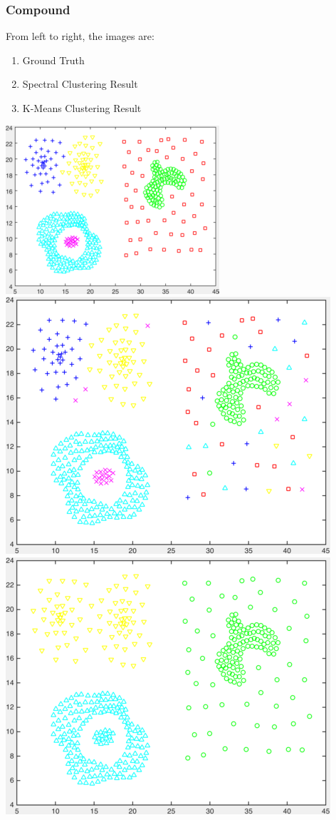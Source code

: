 \documentclass[11pt]{article}
\begin{document}
\subsubsection*{Compound} 
From left to right, the images are:
\begin{enumerate}
\item Ground Truth
\item Spectral Clustering Result
\item K-Means Clustering Result
\end{enumerate}
\begin{center}
\includegraphics[scale=0.5]{compound} \ 
\includegraphics[scale=0.25]{results_spectral_compound} \ 
\includegraphics[scale=0.25]{results_kmeans_compound}
\end{center}
\end{document}
